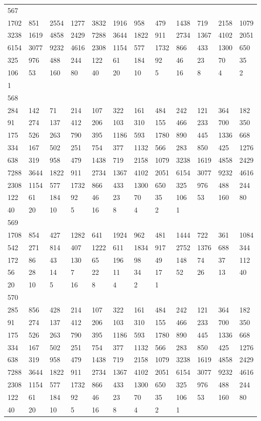 \begin{longtable}{llllllllllll}
567&&&&&&&&&&&\\
1702& 851& 2554& 1277& 3832& 1916& 958& 479& 1438& 719& 2158& 1079\\
3238& 1619& 4858& 2429& 7288& 3644& 1822& 911& 2734& 1367& 4102& 2051\\
6154& 3077& 9232& 4616& 2308& 1154& 577& 1732& 866& 433& 1300& 650\\
325& 976& 488& 244& 122& 61& 184& 92& 46& 23& 70& 35\\
106& 53& 160& 80& 40& 20& 10& 5& 16& 8& 4& 2\\
1& \\

568&&&&&&&&&&&\\
284& 142& 71& 214& 107& 322& 161& 484& 242& 121& 364& 182\\
91& 274& 137& 412& 206& 103& 310& 155& 466& 233& 700& 350\\
175& 526& 263& 790& 395& 1186& 593& 1780& 890& 445& 1336& 668\\
334& 167& 502& 251& 754& 377& 1132& 566& 283& 850& 425& 1276\\
638& 319& 958& 479& 1438& 719& 2158& 1079& 3238& 1619& 4858& 2429\\
7288& 3644& 1822& 911& 2734& 1367& 4102& 2051& 6154& 3077& 9232& 4616\\
2308& 1154& 577& 1732& 866& 433& 1300& 650& 325& 976& 488& 244\\
122& 61& 184& 92& 46& 23& 70& 35& 106& 53& 160& 80\\
40& 20& 10& 5& 16& 8& 4& 2& 1& \\

569&&&&&&&&&&&\\
1708& 854& 427& 1282& 641& 1924& 962& 481& 1444& 722& 361& 1084\\
542& 271& 814& 407& 1222& 611& 1834& 917& 2752& 1376& 688& 344\\
172& 86& 43& 130& 65& 196& 98& 49& 148& 74& 37& 112\\
56& 28& 14& 7& 22& 11& 34& 17& 52& 26& 13& 40\\
20& 10& 5& 16& 8& 4& 2& 1& \\

570&&&&&&&&&&&\\
285& 856& 428& 214& 107& 322& 161& 484& 242& 121& 364& 182\\
91& 274& 137& 412& 206& 103& 310& 155& 466& 233& 700& 350\\
175& 526& 263& 790& 395& 1186& 593& 1780& 890& 445& 1336& 668\\
334& 167& 502& 251& 754& 377& 1132& 566& 283& 850& 425& 1276\\
638& 319& 958& 479& 1438& 719& 2158& 1079& 3238& 1619& 4858& 2429\\
7288& 3644& 1822& 911& 2734& 1367& 4102& 2051& 6154& 3077& 9232& 4616\\
2308& 1154& 577& 1732& 866& 433& 1300& 650& 325& 976& 488& 244\\
122& 61& 184& 92& 46& 23& 70& 35& 106& 53& 160& 80\\
40& 20& 10& 5& 16& 8& 4& 2& 1& \\


\end{longtable}

